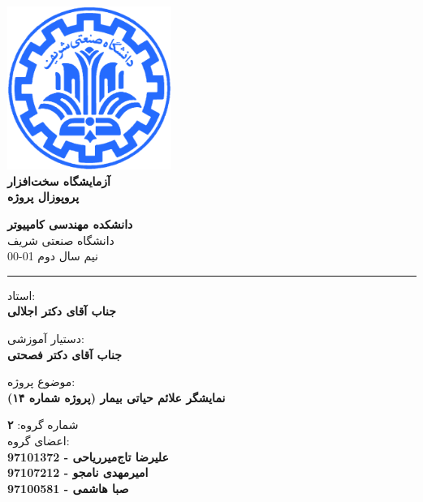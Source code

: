 \documentclass[12pt]{article}
\begin{document}
\begin{titlepage}
\begin{center}
        
\vspace*{0.7cm}

\includegraphics[width=0.4\textwidth]{sharif1.png}\\
\vspace{0.5cm}
\textbf{ \Huge{\emph ‌آزمایشگاه سخت‌افزار} }\\
\vspace{0.5cm}
\textbf{ \Large{ پروپوزال پروژه} }
\vspace{0.2cm}
       
 
      \large \textbf{دانشکده مهندسی کامپیوتر}\\\vspace{0.2cm}
    \large   دانشگاه صنعتی شریف\\\vspace{0.2cm}
       \large   ﻧﯿﻢ سال دوم 01-00 \\\vspace{0.2cm}
      \noindent\rule[1ex]{\linewidth}{1pt}
استاد:\\
    \textbf{{جناب آقای دکتر اجلالی}}


دستیار آموزشی:\\
\textbf{{جناب آقای دکتر فصحتی}}

    \vspace{0.25cm}
    
    موضوع پروژه:\\
    
    \textbf{{نمایشگر علائم حیاتی بیمار (پروژه شماره ۱۴)}}
    
    \vspace{0.35cm}
    
    
        شماره گروه:
    \textbf{{۲}}\\
    
اعضای گروه:\\

    \textbf{{علیرضا تاج‌میرریاحی - 97101372}}
    \\
   
     \textbf{{امیرمهدی نامجو - 97107212}}   
   \\
   
    \textbf{{ صبا هاشمی  - 97100581}}
\end{center}
\end{titlepage}
\end{document}
